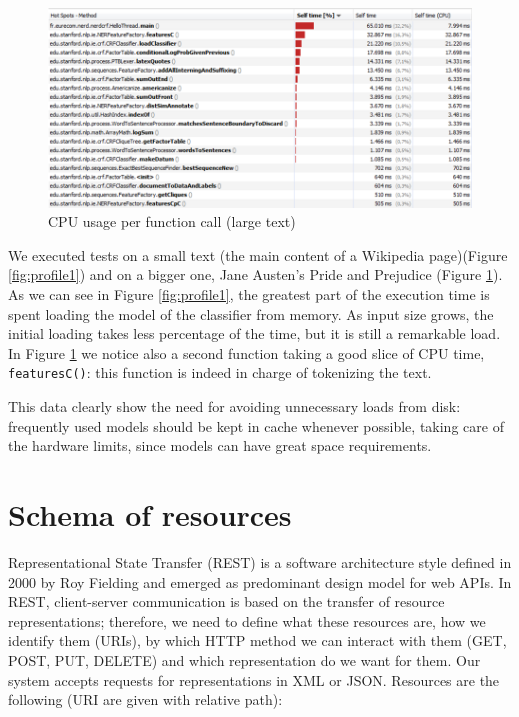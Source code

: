 \documentclass[a4paper,11pt]{report}
\begin{document}
\begin{figure}[htbp] 
\centering
\includegraphics[width=\textwidth]{functions2}
\caption{CPU usage per function call (large text)}
\label{fig:profile2}
\end{figure}

We executed tests on a small text (the main content of a Wikipedia page)(Figure \ref{fig:profile1}) and on a bigger one, Jane Austen's Pride and Prejudice (Figure \ref{fig:profile2}).
As we can see in Figure \ref{fig:profile1}, the greatest part of the execution time is spent loading the model of the classifier from memory. As input size grows, the initial loading takes less percentage of the time, but it is still a remarkable load. In Figure \ref{fig:profile2} we notice also a second function taking a good slice of CPU time, \texttt{featuresC()}: this function is indeed in charge of tokenizing the text.

This data clearly show the need for avoiding unnecessary loads from disk: frequently used models should be kept in cache whenever possible, taking care of the hardware limits, since models can have great space requirements.

\section{Schema of resources}
Representational State Transfer (REST) is a software architecture style defined in 2000 by Roy Fielding and emerged as predominant design model for web APIs. %
In REST, client-server communication is based on the transfer of resource representations; therefore, we need to define what these resources are, how we identify them (URIs), by which HTTP method we can interact with them (GET, POST, PUT, DELETE) and which representation do we want for them.
Our system accepts requests for representations in XML or JSON.
Resources are the following (URI are given with relative path):
\end{document}
